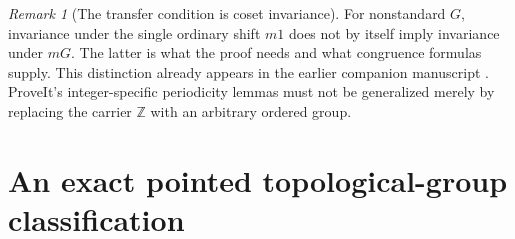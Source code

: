 \documentclass[11pt]{article}
\numberwithin{equation}{section}
\theoremstyle{definition}
\theoremstyle{remark}
\newtheorem{remark}[remark]{Remark}
\newcommand{\Z}{\mathbb Z}
\begin{document}
\begin{remark}[The transfer condition is coset invariance]
For nonstandard $G$, invariance under the single ordinary shift $m1$
does not by itself imply invariance under $mG$. The latter is what the
proof needs and what congruence formulas supply. This distinction already
appears in the earlier companion manuscript \cite{s08:PriorPres}. ProveIt's
integer-specific periodicity lemmas must not be generalized merely by
replacing the carrier $\Z$ with an arbitrary ordered group.
\end{remark}

\section{An exact pointed topological-group classification}
\label{pma:lc:sec:classification}
\end{document}
